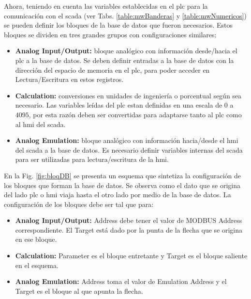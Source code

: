 Ahora, teniendo en cuenta las variables establecidas en el \gls{plc} 
para la comunicación con el \gls{scada} (ver 
Tabs. \ref{table:mwBanderas} y
\ref{table:mwNumericos}) se pueden definir los bloques de la base
de datos que fueron necesarios. Estos bloques se dividen en tres
grandes grupos con configuraciones similares:
 
\begin{itemize}
 \item \textbf{Analog Input/Output:} bloque analógico con información 
desde/hacia el 
  \gls{plc} a la base de datos. Se deben definir entradas a la base de datos
con
  la dirección del espacio de memoria en el \gls{plc}, para poder acceder en
  Lectura/Escritura en estos registros.
 \item \textbf{Calculation:}  conversiones en unidades de ingeniería o
porcentual
  según sea necesario. Las variables leídas del \gls{plc} estan definidas en 
  una escala de $0$ a $4095$, por esta razón deben ser convertidas para
adaptarse tanto al \gls{plc} como al \gls{hmi} del \gls{scada}.
 \item \textbf{Analog Emulation:} bloque analógico con información hacia/desde
el
  \gls{hmi} del \gls{scada} a la base de datos. Es necesario definir variables 
  internas del \gls{scada} para ser utilizadas para lectura/escritura de la 
  \gls{hmi}.
\end{itemize}

En la Fig. \ref{fig:bloqDB} se presenta un esquema que sintetiza la
configuración de los bloques que forman la base de datos. Se observa
como el dato que se origina del lado \gls{plc} o \gls{hmi} viaja hasta el otro 
lado por medio de la base de datos. La configuración de los bloques debe ser tal 
que para:

\begin{itemize}
  \item \textbf{Analog Input/Output:} Address debe tener el valor de MODBUS
  Address correspondiente. El Target está dado por la punta de la flecha que se
  origina en ese bloque.
  \item \textbf{Calculation:} Parameter es el bloque entretante y Target es el
  bloque saliente en el esquema.
  \item \textbf{Analog Emulation:} Address toma el valor de Emulation Address y
  el Target es el bloque al que apunta la flecha. 
\end{itemize}



